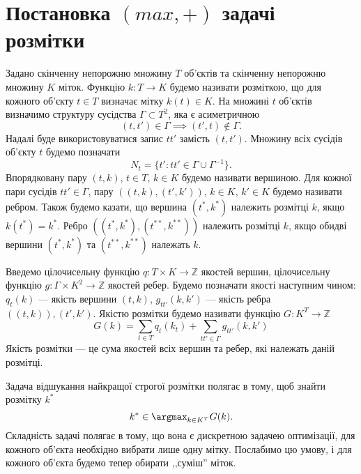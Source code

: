 \section{Постановка \((max,+)\) задачі розмітки}

Задано скінченну непорожню множину $T$ об'єктів та скінченну
непорожню множину $K$ міток. Функцію $k:T\rightarrow K$ будемо
називати розміткою, що для кожного об'єкту $t\in T$ визначає мітку
$k(t)\in K$. На множині $t$ об'єктів визначимо структуру сусідства 
$\Gamma \subset T^2$, яка є асиметричною
\begin{equation}
      (t,t') \in \Gamma\implies (t',t) \notin \Gamma.
  \end{equation}
Надалі буде використовуватися запис $tt'$ замість $(t,t')$. Множину 
всіх сусідів об'єкту $t$ будемо позначати 
\begin{equation}
      N_t = \{ t':tt'\in \Gamma \cup \Gamma^{-1}\}.
  \end{equation}
Впорядковану пару $(t, k)$, $t \in T$, $k \in K$ будемо називати вершиною.
Для кожної пари сусідів $tt'\in\Gamma$, пару $((t,k),(t',k'))$, $k\in K$, $k'\in K$
будемо називати ребром. Також будемо казати, що вершина  $(t^*, k^*)$ належить
розмітці $k$, якщо $k(t^*)=k^*$. Ребро $((t^*,k^*),(t^{**},k^{**}))$ належить
розмітці $k$, якщо обидві вершини $(t^*,k^*)$ та $(t^{**},k^{**})$ належать $k$.

Введемо цілочисельну функцію $q:T\times K\rightarrow\mathbb{Z}$ якостей вершин, 
цілочисельну функцію $g:\Gamma\times K^2\rightarrow\mathbb{Z}$ якостей ребер. Будемо 
позначати якості наступним чином: $q_t(k)$ --- якість вершини $(t,k)$,
$g_{tt'}(k,k')$ --- якість ребра $((t,k)),(t',k')$. Якістю розмітки будемо називати
функцію $G:K^T\rightarrow \mathbb{Z}$
\begin{equation}
      G(k)=\sum_{t \in T} q_t(k_t) + \sum_{tt' \in \Gamma} g_{tt'}(k,k')
  \end{equation}
Якість розмітки --- це сума якостей всіх вершин та ребер, які належать даній розмітці.

Задача відшукання найкращої строгої розмітки полягає в тому, щоб знайти
розмітку $k^*$
\begin{equation}
      k^* \in \argmax_{k\in K^T} G(k).
      \label{eqn:strict_labeling}
  \end{equation}
Складність задачі полягає в тому, що
вона є дискретною задачею оптимізації, для кожного об'єкта необхідно 
вибрати лише одну мітку. Послабимо цю умову, і для кожного об'єкта будемо 
тепер обирати ,,суміш'' міток.

